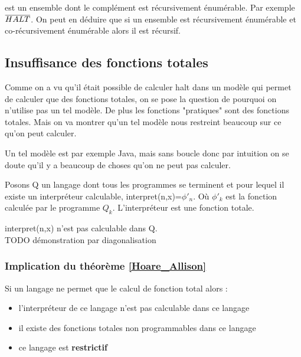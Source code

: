 \begin{mydef} est un ensemble dont le 
	complément est récursivement énumérable. Par exemple $\overline{HALT}$. On peut 
	en déduire que si un ensemble est récursivement énumérable et co-récursivement 
	énumérable alors il est récursif.
\end{mydef}


\subsection{Insuffisance des fonctions totales}
\label{sub:insuffisance_des_fonctions_totales}
Comme on a vu qu'il était possible de calculer halt dans un modèle qui
permet de calculer que des fonctions totales, on se pose la question de 
pourquoi on n'utilise pas un tel modèle. De plus les fonctions "pratiques" sont 
des fonctions totales. Mais on va montrer qu'un tel modèle nous restreint 
beaucoup sur ce qu'on peut calculer.

\begin{myexem}
	Un tel modèle est par exemple Java, mais sans boucle 
	donc par intuition on se doute qu'il y a beaucoup de choses qu'on ne peut pas 
	calculer.
\end{myexem}

\begin{mydef}
	Posons Q un langage dont tous les programmes se terminent et pour 
	lequel il existe un interpréteur calculable, interpret(n,x)=$\phi'_n$. Où
	$\phi'_k$ est la fonction calculée par le programme $Q_k$. L'interpréteur est une 
	fonction totale.
\end{mydef}

\begin{mytheo}
	\label{Hoare_Allison}
	interpret(n,x) n'est pas calculable dans Q.\\
	TODO démonstration par diagonalisation
\end{mytheo}



\subsubsection{Implication du théorème \ref{Hoare_Allison} }

\begin{myprop}
	Si un langage ne permet que le calcul de fonction total alors :
	\begin{itemize}
		\item l'interpréteur de ce langage n'est pas calculable dans ce langage
		\item il existe des fonctions totales non programmables dans ce langage
		\item ce langage est \bf{restrictif}
	\end{itemize}
\end{myprop}
	
